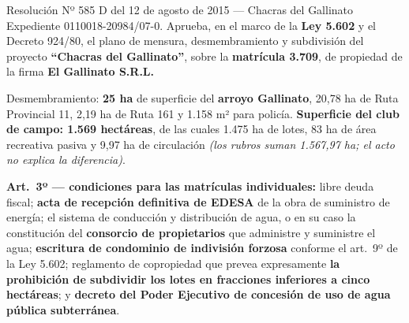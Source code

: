 \begin{ficha}{Resolución Nº 585 D del 12 de agosto de 2015 --- Chacras del Gallinato}
Expediente 0110018-20984/07-0. Aprueba, en el marco de la \textbf{Ley 5.602} y el Decreto 924/80, el plano de mensura, desmembramiento y subdivisión del proyecto \textbf{``Chacras del Gallinato''}, sobre la \textbf{matrícula 3.709}, de propiedad de la firma \textbf{El Gallinato S.R.L.}

Desmembramiento: \textbf{25 ha} de superficie del \textbf{arroyo Gallinato}, 20,78 ha de Ruta Provincial 11, 2,19 ha de Ruta 161 y 1.158 m² para policía. \textbf{Superficie del club de campo: 1.569 hectáreas}, de las cuales 1.475 ha de lotes, 83 ha de área recreativa pasiva y 9,97 ha de circulación \textit{(los rubros suman 1.567,97 ha; el acto no explica la diferencia)}.

\textbf{Art.\ 3º --- condiciones para las matrículas individuales:} libre deuda fiscal; \textbf{acta de recepción definitiva de EDESA} de la obra de suministro de energía; el sistema de conducción y distribución de agua, o en su caso la constitución del \textbf{consorcio de propietarios} que administre y suministre el agua; \textbf{escritura de condominio de indivisión forzosa} conforme el art.\ 9º de la Ley 5.602; reglamento de copropiedad que prevea expresamente \textbf{la prohibición de subdividir los lotes en fracciones inferiores a cinco hectáreas}; y \textbf{decreto del Poder Ejecutivo de concesión de uso de agua pública subterránea}.
\end{ficha}

